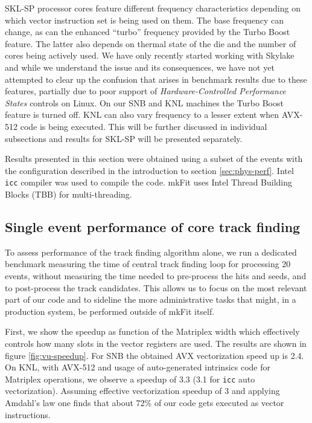 \documentclass{webofc}
\def\mkfit{mkFit\xspace}
\def\stt#1{{\small\texttt{#1}}}
\begin{document}
SKL-SP processor cores feature different frequency characteristics depending on
which vector instruction set is being used on them. The base frequency can
change, as can the enhanced ``turbo'' frequency provided by the Turbo Boost
feature. The latter also depends on thermal state of the die and the number of
cores being actively used. We have only recently started working with Skylake and
while we understand the issue and its consequences, we have not yet attempted to
clear up the confusion that arises in benchmark results due to these features,
partially due to poor support of \emph{Hardware-Controlled Performance States}
controls on Linux. On our SNB and KNL machines the Turbo Boost feature is turned
off. KNL can also vary frequency to a lesser extent when AVX-512 code is being
executed. This will be further discussed in individual subsections and results
for SKL-SP will be presented separately.

Results presented in this section were obtained using a subset of the 
events with the configuration described in the introduction to section 
\ref{sec:phys-perf}. Intel \stt{icc} compiler was used to compile the
code. \mkfit uses Intel Thread Building Blocks (TBB) for multi-threading.


\subsection{Single event performance of core track finding}

To assess performance of the track finding algorithm alone, we run a dedicated
benchmark measuring the time of central track finding loop for processing 20 
events, without measuring the time needed to pre-process the hits and seeds, 
and to post-process the track candidates. This allows us to focus on the most 
relevant part of our code and to sideline the more administrative tasks that 
might, in a production system, be performed outside of \mkfit itself.

First, we show the speedup as function of the Matriplex width which
effectively controls how many slots in the vector registers are used. The
results are shown in figure \ref{fig:vu-speedup}.
For SNB the obtained AVX vectorization speed up is 2.4. On KNL, with AVX-512
and usage of auto-generated intrinsics code for Matriplex operations, we
observe a speedup of 3.3 (3.1 for \stt{icc} auto vectorization). Assuming effective
vectorization speedup of 3 and applying Amdahl's law one finds that about 72\%
of our code gets executed as vector instructions.
\end{document}
